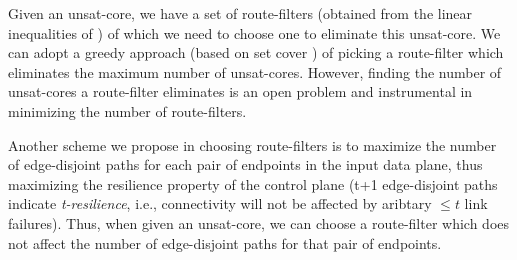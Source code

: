 
Given an unsat-core, we have a set of route-filters (obtained
from the linear inequalities of ) of which we 
need to choose one to eliminate this unsat-core.
We can 
adopt a greedy approach (based on set cover \cite{}) 
of picking a route-filter which 
eliminates the maximum number of unsat-cores. However, 
finding the number of unsat-cores a route-filter eliminates
is an open problem and instrumental in minimizing the number 
of route-filters.

Another scheme we propose in choosing route-filters
is to maximize the number of edge-disjoint paths for each pair of
endpoints in the input data plane, thus maximizing the resilience 
property of the control plane (t+1 edge-disjoint paths indicate
{\em t-resilience}, i.e., connectivity will not 
be affected by aribtary $\leq t$ link failures). 
Thus, when given an unsat-core, we can choose
a route-filter which does not affect the number of edge-disjoint paths
for that pair of endpoints.



